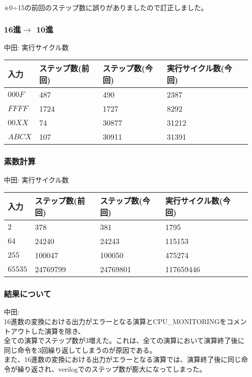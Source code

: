 \documentclass{jsarticle}
\begin{document}
※0÷15の前回のステップ数に誤りがありましたので訂正しました。\\


\subsubsection*{16進$\rightarrow$ 10進}
中田:
実行サイクル数
\begin{table}[h]
  \begin{tabular}{|l|l|l|l|l|} \hline
    入力 & ステップ数(前回) & ステップ数(今回) & 実行サイクル数(今回) \\ \hline
    $000F$ & 487 & 490 & 2387 \\ \hline
    $FFFF$ & 1724 & 1727 & 8292 \\ \hline
    $00XX$ & 74 & 30877 & 31212 \\ \hline
    $ABCX$ & 107 & 30911 & 31391 \\ \hline
  \end{tabular}
\end{table}

\subsubsection*{素数計算}
中田:
実行サイクル数
\begin{table}[h]
  \begin{tabular}{|l|l|l|l|l|} \hline
    入力 & ステップ数(前回) & ステップ数(今回) & 実行サイクル数(今回) \\ \hline
    $2$ & 378 & 381 & 1795 \\ \hline
    $64$ & 24240 & 24243 & 115153 \\ \hline
    $255$ & 100047 & 100050 & 475274 \\ \hline
    $65535$ & 24769799 & 24769801\footnotemark[1] & 117659446 \footnotemark[1] \\ \hline
  \end{tabular}
\end{table}

\subsubsection*{結果について}
中田: \\
16進数の変換における出力がエラーとなる演算とCPU\_MONITORINGをコメントアウトした演算を除き、 \\
全ての演算でステップ数が3増えた。これは、全ての演算において演算終了後に同じ命令を3回繰り返してしまうのが原因である。 \\
また、16進数の変換における出力がエラーとなる演算では、演算終了後に同じ命令が繰り返され、verilogでのステップ数が膨大になってしまった。
\end{document}
